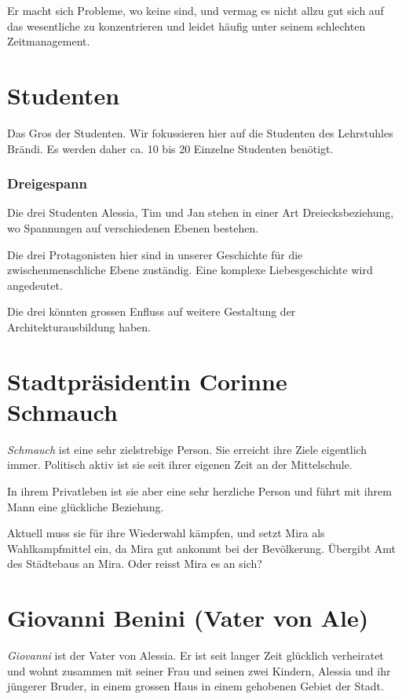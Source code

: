 \documentclass[11pt,a4paper,ngerman]{scrreprt}
\begin{document}
Er macht sich Probleme, wo keine sind, und vermag es nicht allzu gut sich auf
das wesentliche zu konzentrieren und leidet häufig unter seinem schlechten
Zeitmanagement.

\section*{Studenten}

Das Gros der Studenten. Wir fokussieren hier auf die Studenten des
Lehrstuhles Brändi. Es werden daher ca. 10 bis 20 Einzelne Studenten
benötigt.

\subsubsection{Dreigespann}

Die drei Studenten Alessia, Tim und Jan stehen in einer Art
Dreiecksbeziehung, wo Spannungen auf verschiedenen Ebenen bestehen.

Die drei Protagonisten hier sind in unserer Geschichte für die
zwischenmenschliche Ebene zuständig. Eine komplexe Liebesgeschichte wird
angedeutet.

Die drei könnten grossen Enfluss auf weitere Gestaltung der
Architekturausbildung haben.

\section*{Stadtpräsidentin Corinne Schmauch}

\emph{Schmauch} ist eine sehr zielstrebige Person. Sie erreicht ihre Ziele
eigentlich immer. Politisch aktiv ist sie seit ihrer eigenen Zeit an der
Mittelschule.

In ihrem Privatleben ist sie aber eine sehr herzliche Person und führt mit
ihrem Mann eine glückliche Beziehung.

Aktuell muss sie für ihre Wiederwahl kämpfen, und setzt Mira als
Wahlkampfmittel ein, da Mira gut ankommt bei der Bevölkerung.  Übergibt Amt
des Städtebaus an Mira. Oder reisst Mira es an sich?

\section*{Giovanni Benini (Vater von Ale)}

\emph{Giovanni} ist der Vater von Alessia. Er ist seit langer Zeit glücklich
verheiratet und wohnt zusammen mit seiner Frau und seinen zwei Kindern,
Alessia und ihr jüngerer Bruder, in einem grossen Haus in einem gehobenen
Gebiet der Stadt.
\end{document}
